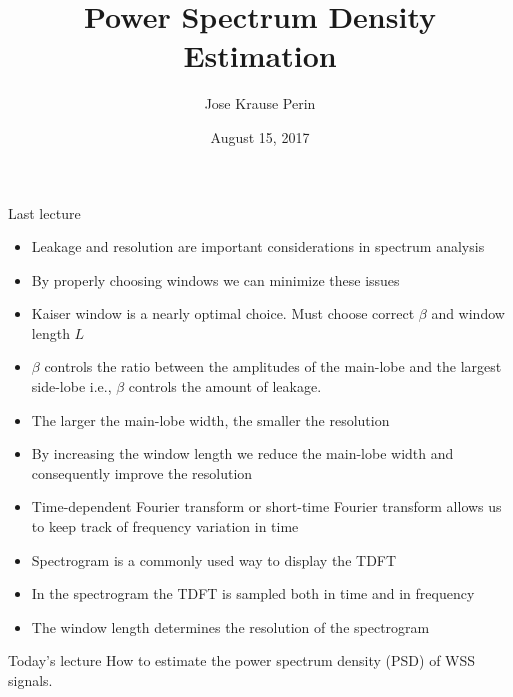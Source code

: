 \documentclass[10pt, aspectratio=169, handout]{beamer}
\title[EE 264]{Power Spectrum Density Estimation}
\author{Jose Krause Perin}
\institute{Stanford University}
\date{August 15, 2017}
\begin{document}
\begin{frame}
  \titlepage
\end{frame}

%
\begin{frame}{Last lecture}
\begin{itemize}
	\item Leakage and resolution are important considerations in spectrum analysis
	\item By properly choosing windows we can minimize these issues
	\item Kaiser window is a nearly optimal choice. Must choose correct $\beta$ and window length $L$
	\item $\beta$ controls the ratio between the amplitudes of the main-lobe and the largest side-lobe i.e., $\beta$ controls the amount of leakage.
	\item The larger the main-lobe width, the smaller the resolution
	\item By increasing the window length we reduce the main-lobe width and consequently improve the resolution
	\item Time-dependent Fourier transform or short-time Fourier transform allows us to keep track of frequency variation in time
	\item Spectrogram is a commonly used way to display the TDFT
	\item In the spectrogram the TDFT is sampled both in time and in frequency
	\item The window length determines the resolution of the spectrogram
\end{itemize}
\end{frame}

%
\begin{frame}{Today's lecture}
	How to estimate the power spectrum density (PSD) of WSS signals.
	\tableofcontents
\end{frame}
\end{document}
